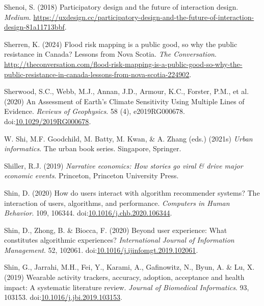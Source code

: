 \documentclass[
  letterpaper,
  DIV=11,
  numbers=noendperiod]{scrartcl}
\newlength{\cslhangindent}
\newenvironment{CSLReferences}[2] %
 {\begin{list}{}{%
  \setlength{\itemindent}{0pt}
  \setlength{\leftmargin}{0pt}
  \setlength{\parsep}{0pt}
  \ifodd #1
   \setlength{\leftmargin}{\cslhangindent}
   \setlength{\itemindent}{-1\cslhangindent}
  \fi
  \setlength{\itemsep}{#2\baselineskip}}}
 {\end{list}}
\begin{document}
\begin{CSLReferences}{0}{1}
Shenoi, S. (2018) Participatory design and the future of interaction
design. \emph{Medium}.
\url{https://uxdesign.cc/participatory-design-and-the-future-of-interaction-design-81a11713bbf}.

Sherren, K. (2024) Flood risk mapping is a public good, so why the
public resistance in {Canada}? {Lessons} from {Nova Scotia}. \emph{The
Conversation}.
\url{http://theconversation.com/flood-risk-mapping-is-a-public-good-so-why-the-public-resistance-in-canada-lessons-from-nova-scotia-224902}.

Sherwood, S.C., Webb, M.J., Annan, J.D., Armour, K.C., Forster, P.M., et
al. (2020) An {Assessment} of {Earth}'s {Climate Sensitivity Using
Multiple Lines} of {Evidence}. \emph{Reviews of Geophysics}. 58 (4),
e2019RG000678.
doi:\href{https://doi.org/10.1029/2019RG000678}{10.1029/2019RG000678}.

W. Shi, M.F. Goodchild, M. Batty, M. Kwan, \& A. Zhang (eds.) (2021s)
\emph{Urban informatics}. The urban book series. Singapore, Springer.

Shiller, R.J. (2019) \emph{Narrative economics: How stories go viral \&
drive major economic events}. Princeton, Princeton University Press.

Shin, D. (2020) How do users interact with algorithm recommender
systems? {The} interaction of users, algorithms, and performance.
\emph{Computers in Human Behavior}. 109, 106344.
doi:\href{https://doi.org/10.1016/j.chb.2020.106344}{10.1016/j.chb.2020.106344}.

Shin, D., Zhong, B. \& Biocca, F. (2020) Beyond user experience: {What}
constitutes algorithmic experiences? \emph{International Journal of
Information Management}. 52, 102061.
doi:\href{https://doi.org/10.1016/j.ijinfomgt.2019.102061}{10.1016/j.ijinfomgt.2019.102061}.

Shin, G., Jarrahi, M.H., Fei, Y., Karami, A., Gafinowitz, N., Byun, A.
\& Lu, X. (2019) Wearable activity trackers, accuracy, adoption,
acceptance and health impact: {A} systematic literature review.
\emph{Journal of Biomedical Informatics}. 93, 103153.
doi:\href{https://doi.org/10.1016/j.jbi.2019.103153}{10.1016/j.jbi.2019.103153}.


\end{CSLReferences}
\end{document}
